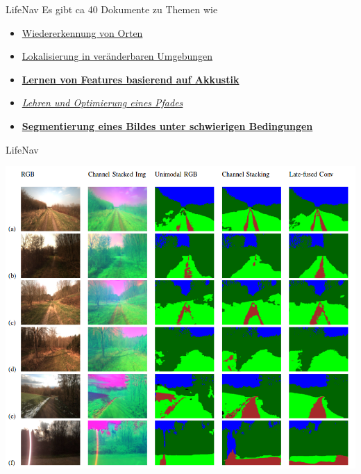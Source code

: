 \documentclass[aspectratio=169]{beamer}
\begin{document}
  \begin{frame}{LifeNav}
  	Es gibt ca 40 Dokumente zu Themen wie
  	\begin{itemize}
  		\item \href{http://www.lifelong-navigation.eu/files/tipaldi13icra.pdf}{Wiedererkennung von Orten}
  		\pause		
  		\item \href{http://www.lifelong-navigation.eu/files/tipaldi13ijrr.pdf}{Lokalisierung in veränderbaren Umgebungen}
  		\pause
  		\item \href{http://www.lifelong-navigation.eu/files/valada15isrr.pdf}{\textbf{Lernen von Features basierend auf Akkustik}}
  		\pause
  		\item \href{http://www.lifelong-navigation.eu/files/mazuran15icra.pdf}{\textit{Lehren und Optimierung eines Pfades}}
  		\pause
  		\item \href{http://www.lifelong-navigation.eu/files/valada16rssws.pdf}{\textbf{Segmentierung eines Bildes unter schwierigen Bedingungen}}
  	\end{itemize}
  \end{frame}
  
  \begin{frame}{LifeNav}
  	\begin{center}
  		\includegraphics[scale=0.26]{img/segmentation.png}
  	\end{center}
  \end{frame}
  
\end{document}

